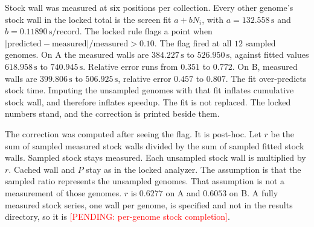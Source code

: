 \documentclass[letterpaper,twocolumn,10pt]{article}
\newcommand{\pending}[1]{\textcolor{red}{[PENDING: #1]}}
\begin{document}
Stock wall was measured at six positions per collection.
Every other genome's stock wall in the locked total is the screen fit $a + b N_i$, with
$a = 132.558\,\mathrm{s}$
and
$b = 0.11890\,\mathrm{s}/\mathrm{record}$.
The locked rule flags a point when $|{\mathrm{predicted}}-\mathrm{measured}|/\mathrm{measured} > 0.10$.
The flag fired at all
$12$
sampled genomes.
On A the measured walls are
$384.227\,\mathrm{s}$
to
$526.950\,\mathrm{s}$,
against fitted values
$618.958\,\mathrm{s}$
to
$740.945\,\mathrm{s}$.
Relative error runs from
$0.351$
to
$0.772$.
On B, measured walls are
$399.806\,\mathrm{s}$
to
$506.925\,\mathrm{s}$,
relative error
$0.457$
to
$0.807$.
The fit over-predicts stock time.
Imputing the unsampled genomes with that fit inflates cumulative stock wall, and therefore inflates speedup.
The fit is not replaced.
The locked numbers stand, and the correction is printed beside them.

The correction was computed after seeing the flag.
It is post-hoc.
Let $r$ be the sum of sampled measured stock walls divided by the sum of sampled fitted stock walls.
Sampled stock stays measured.
Each unsampled stock wall is multiplied by $r$.
Cached wall and $P$ stay as in the locked analyzer.
The assumption is that the sampled ratio represents the unsampled genomes.
That assumption is not a measurement of those genomes.
$r$ is
$0.6277$
on A and
$0.6053$
on B.
A fully measured stock series, one wall per genome, is specified and not in the results directory, so it is
\pending{per-genome stock completion}.
\end{document}
